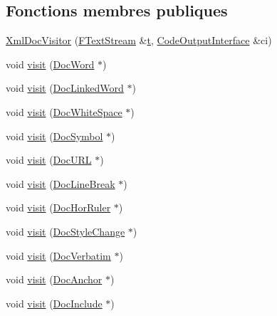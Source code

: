 \subsection*{Fonctions membres publiques}
\begin{DoxyCompactItemize}
\item 
\hyperlink{class_xml_doc_visitor_a98b67fb17b406a4e5527764c3ab0568c}{Xml\+Doc\+Visitor} (\hyperlink{class_f_text_stream}{F\+Text\+Stream} \&\hyperlink{058__bracket__recursion_8tcl_a69e959f6901827e4d8271aeaa5fba0fc}{t}, \hyperlink{class_code_output_interface}{Code\+Output\+Interface} \&ci)
\item 
void \hyperlink{class_xml_doc_visitor_a1a09e474cba74f7a8ed902ce8c2ddb33}{visit} (\hyperlink{class_doc_word}{Doc\+Word} $\ast$)
\item 
void \hyperlink{class_xml_doc_visitor_a48ba844db6d6701b26bfedb1cb9e8649}{visit} (\hyperlink{class_doc_linked_word}{Doc\+Linked\+Word} $\ast$)
\item 
void \hyperlink{class_xml_doc_visitor_a49eeb551297981b25677252efd2784a8}{visit} (\hyperlink{class_doc_white_space}{Doc\+White\+Space} $\ast$)
\item 
void \hyperlink{class_xml_doc_visitor_a5515884fb3aa00e1c5c7f649d82b7ab7}{visit} (\hyperlink{class_doc_symbol}{Doc\+Symbol} $\ast$)
\item 
void \hyperlink{class_xml_doc_visitor_a7ea97d2a1bc209d4c38381bb0d56c523}{visit} (\hyperlink{class_doc_u_r_l}{Doc\+U\+R\+L} $\ast$)
\item 
void \hyperlink{class_xml_doc_visitor_aa270bbaf630a50d79708ecd4384690a5}{visit} (\hyperlink{class_doc_line_break}{Doc\+Line\+Break} $\ast$)
\item 
void \hyperlink{class_xml_doc_visitor_a309a6e37c650e4d3f54f3ca507e47b63}{visit} (\hyperlink{class_doc_hor_ruler}{Doc\+Hor\+Ruler} $\ast$)
\item 
void \hyperlink{class_xml_doc_visitor_a97e68c8fa291c5ef8be6d47145b775ce}{visit} (\hyperlink{class_doc_style_change}{Doc\+Style\+Change} $\ast$)
\item 
void \hyperlink{class_xml_doc_visitor_a319598ee7dd945a71f9e12ea5003d64e}{visit} (\hyperlink{class_doc_verbatim}{Doc\+Verbatim} $\ast$)
\item 
void \hyperlink{class_xml_doc_visitor_a84e6b8cb9a97f9d720cdaf12fb5bbdb1}{visit} (\hyperlink{class_doc_anchor}{Doc\+Anchor} $\ast$)
\item 
void \hyperlink{class_xml_doc_visitor_a8c56512a8f57fbf8eba0f6804a74f3ce}{visit} (\hyperlink{class_doc_include}{Doc\+Include} $\ast$)

\end{DoxyCompactItemize}
